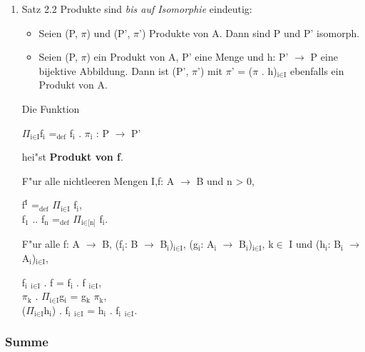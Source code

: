 \documentclass[11pt]{article}
\begin{document}
\begin{enumerate}
\item Satz 2.2 Produkte sind \emph{bis auf Isomorphie} eindeutig:
\label{sec-2-3-1-1}
\begin{itemize}
\item Seien (P, $\pi$) und (P', $\pi$') Produkte von A. Dann sind P und P' isomorph.
\item Seien (P, $\pi$) ein Produkt von A, P' eine Menge und h: P' $\to$ P eine bijektive Abbildung. Dann ist (P', $\pi$') mit $\pi$' = ($\pi$ . h)$_{\text{i} \in \text{I}}$ ebenfalls ein Produkt von A.
\end{itemize}


Die Funktion 
\begin{center}
$\Pi$$_{\text{i} \in \text{I}}$f$_{\text{i}}$ =$_{\text{def}}$ \langle f$_{\text{i}}$ . $\pi$$_{\text{i}}$ \rangle : P $\to$ P'  
\end{center}
hei"st \textbf{Produkt von f}.

F"ur alle nichtleeren Mengen I,f: A $\to$ B und n > 0,

\begin{center}
f$^{\text{I}}$ =$_{\text{def}}$ $\Pi$$_{\text{i} \in \text{I}}$ f$_{\text{i}}$,  \\
f$_{\text{1}}$ \texttimes{} .. \texttimes{} f$_{\text{n}}$ =$_{\text{def}}$ $\Pi$$_{\text{i} \in \text{[n]}}$ f$_{\text{i}}$.
\end{center}

F"ur alle f: A $\to$ B, (f$_{\text{i}}$: B $\to$ B$_{\text{i}}$)$_{\text{i} \in \text{I}}$, (g$_{\text{i}}$: A$_{\text{i}}$ $\to$ B$_{\text{i}}$)$_{\text{i} \in \text{I}}$, k$\in$ I und (h$_{\text{i}}$: B$_{\text{i}}$ $\to$ A$_{\text{i}}$)$_{\text{i} \in \text{I}}$,
\begin{center}
\langle f$_{\text{i}}$ \rangle$_{\text{i} \in \text{I}}$ . f = \langle f$_{\text{i}}$ . f \rangle$_{\text{i} \in \text{I}}$, \\
$\pi$$_{\text{k}}$ . $\Pi$$_{\text{i} \in \text{I}}$g$_{\text{i}}$ = g$_{\text{k}}$ $\pi$$_{\text{k}}$, \\
($\Pi$$_{\text{i} \in \text{I}}$h$_{\text{i}}$) . \langle f$_{\text{i}}$ \rangle$_{\text{i} \in \text{I}}$ = \langle h$_{\text{i}}$ . f$_{\text{i}}$ \rangle$_{\text{i} \in \text{I}}$. \\
\end{center}
\end{enumerate}

\subsubsection{Summe}
\label{sec-2-3-2}
\end{document}
